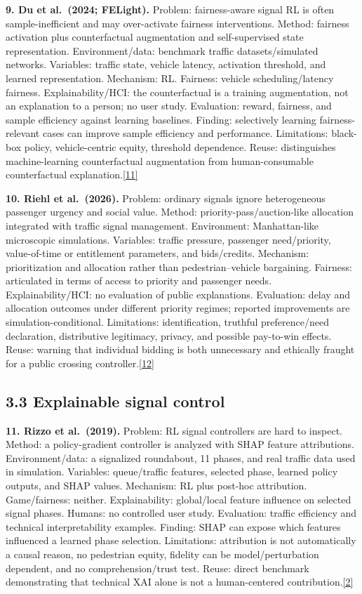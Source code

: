 \documentclass[
  english,
  11pt,
  a4paper,
]{article}
\begin{document}
\textbf{9. Du et al.~(2024; FELight).} Problem: fairness-aware signal RL
is often sample-inefficient and may over-activate fairness
interventions. Method: fairness activation plus counterfactual
augmentation and self-supervised state representation. Environment/data:
benchmark traffic datasets/simulated networks. Variables: traffic state,
vehicle latency, activation threshold, and learned representation.
Mechanism: RL. Fairness: vehicle scheduling/latency fairness.
Explainability/HCI: the counterfactual is a training augmentation, not
an explanation to a person; no user study. Evaluation: reward, fairness,
and sample efficiency against learning baselines. Finding: selectively
learning fairness-relevant cases can improve sample efficiency and
performance. Limitations: black-box policy, vehicle-centric equity,
threshold dependence. Reuse: distinguishes machine-learning
counterfactual augmentation from human-consumable counterfactual
explanation.\hyperref[source-11]{[11]}

\textbf{10. Riehl et al.~(2026).} Problem: ordinary signals ignore
heterogeneous passenger urgency and social value. Method:
priority-pass/auction-like allocation integrated with traffic signal
management. Environment: Manhattan-like microscopic simulations.
Variables: traffic pressure, passenger need/priority, value-of-time or
entitlement parameters, and bids/credits. Mechanism: prioritization and
allocation rather than pedestrian--vehicle bargaining. Fairness:
articulated in terms of access to priority and passenger needs.
Explainability/HCI: no evaluation of public explanations. Evaluation:
delay and allocation outcomes under different priority regimes; reported
improvements are simulation-conditional. Limitations: identification,
truthful preference/need declaration, distributive legitimacy, privacy,
and possible pay-to-win effects. Reuse: warning that individual bidding
is both unnecessary and ethically fraught for a public crossing
controller.\hyperref[source-12]{[12]}

\subsection{3.3 Explainable signal
control}\label{explainable-signal-control}

\textbf{11. Rizzo et al.~(2019).} Problem: RL signal controllers are
hard to inspect. Method: a policy-gradient controller is analyzed with
SHAP feature attributions. Environment/data: a signalized roundabout, 11
phases, and real traffic data used in simulation. Variables:
queue/traffic features, selected phase, learned policy outputs, and SHAP
values. Mechanism: RL plus post-hoc attribution. Game/fairness: neither.
Explainability: global/local feature influence on selected signal
phases. Humans: no controlled user study. Evaluation: traffic efficiency
and technical interpretability examples. Finding: SHAP can expose which
features influenced a learned phase selection. Limitations: attribution
is not automatically a causal reason, no pedestrian equity, fidelity can
be model/perturbation dependent, and no comprehension/trust test. Reuse:
direct benchmark demonstrating that technical XAI alone is not a
human-centered contribution.\hyperref[source-2]{[2]}
\end{document}
